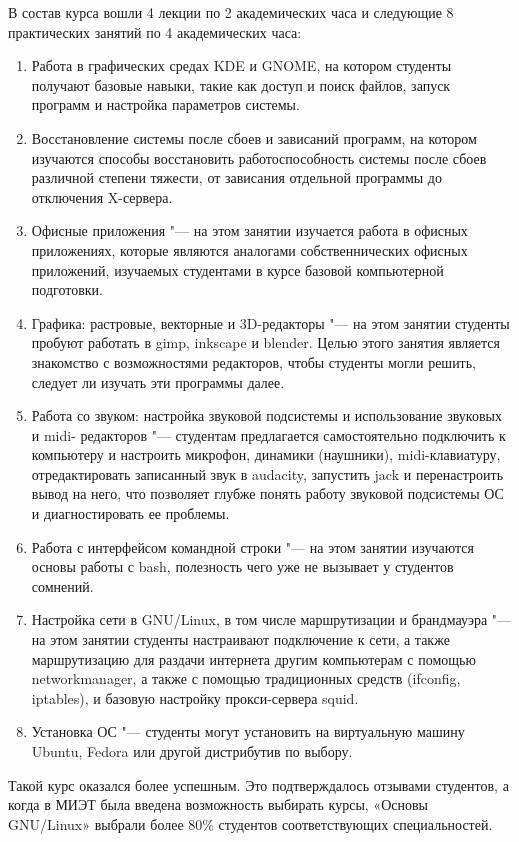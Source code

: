 \documentclass[10pt, a5paper]{article}
\begin{document}
В состав курса вошли 4 лекции по 2 академических часа и следующие 8 практических занятий по 4 академических часа:

\begin{enumerate}
  \item Работа в графических средах KDE и GNOME, на котором студенты получают базовые навыки, такие как доступ и поиск файлов, запуск программ и настройка параметров системы.
  \item Восстановление системы после сбоев и зависаний программ, на котором изучаются способы восстановить работоспособность системы после сбоев различной степени тяжести, от зависания отдельной программы до отключения X-сервера.
  \item Офисные приложения "--- на этом занятии изучается работа в офисных приложениях, которые являются аналогами собственнических офисных приложений, изучаемых студентами в курсе базовой компьютерной подготовки.
  \item Графика: растровые, векторные и 3D-редакторы "--- на этом занятии студенты пробуют работать в gimp, inkscape и blender. Целью этого занятия является знакомство с возможностями редакторов, чтобы студенты могли решить, следует ли изучать эти программы далее.
  \item Работа со звуком: настройка звуковой подсистемы и использование звуковых и midi- редакторов "--- студентам предлагается самостоятельно подключить к компьютеру и настроить микрофон, динамики (наушники), midi-клавиатуру, отредактировать записанный звук в audacity, запустить jack и перенастроить вывод на него, что позволяет глубже понять работу звуковой подсистемы ОС и диагностировать ее проблемы.
  \item Работа с интерфейсом командной строки "--- на этом занятии изучаются основы работы с bash, полезность чего уже не вызывает у студентов сомнений.
  \item Настройка сети в GNU/Linux, в том числе маршрутизации и брандмауэра "--- на этом занятии студенты настраивают подключение к сети, а также маршрутизацию для раздачи интернета другим компьютерам с помощью networkmanager, а также с помощью традиционных средств (ifconfig, iptables), и базовую настройку прокси-сервера squid.
  \item Установка ОС "--- студенты могут установить на виртуальную машину Ubuntu, Fedora или другой дистрибутив по выбору.
\end{enumerate}

Такой курс оказался более успешным. Это подтверждалось отзывами студентов, а когда в МИЭТ была введена возможность выбирать курсы, «Основы GNU/Linux» выбрали более 80\% студентов соответствующих специальностей.
\end{document}
